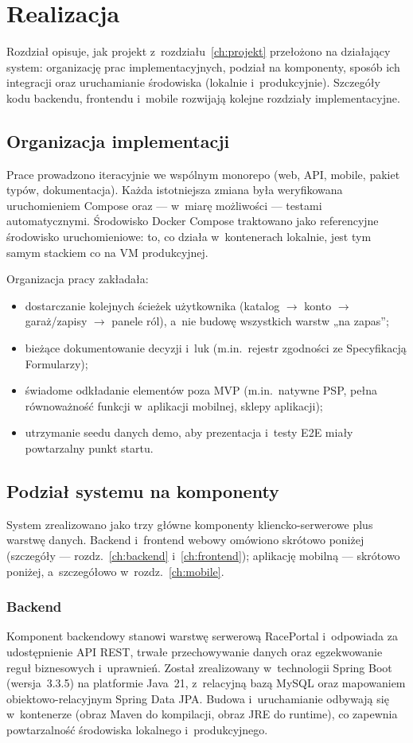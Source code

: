 \documentclass{sprz}
\begin{document}
\chapter{Realizacja}
\label{ch:realizacja}
Rozdział opisuje, jak projekt z~rozdziału~\ref{ch:projekt} przełożono na działający system: organizację prac implementacyjnych, podział na komponenty, sposób ich integracji oraz uruchamianie środowiska (lokalnie i~produkcyjnie). Szczegóły kodu backendu, frontendu i~mobile rozwijają kolejne rozdziały implementacyjne.

\section{Organizacja implementacji}
Prace prowadzono iteracyjnie we wspólnym monorepo (web, API, mobile, pakiet typów, dokumentacja). Każda istotniejsza zmiana była weryfikowana uruchomieniem Compose oraz --- w~miarę możliwości --- testami automatycznymi. Środowisko Docker Compose traktowano jako referencyjne środowisko uruchomieniowe: to, co działa w~kontenerach lokalnie, jest tym samym stackiem co na VM produkcyjnej.

Organizacja pracy zakładała:
\begin{itemize}
  \item dostarczanie kolejnych ścieżek użytkownika (katalog $\rightarrow$ konto $\rightarrow$ garaż/zapisy $\rightarrow$ panele ról), a~nie budowę wszystkich warstw „na zapas”;
  \item bieżące dokumentowanie decyzji i~luk (m.in.\ rejestr zgodności ze Specyfikacją Formularzy);
  \item świadome odkładanie elementów poza MVP (m.in.\ natywne PSP, pełna równoważność funkcji w~aplikacji mobilnej, sklepy aplikacji);
  \item utrzymanie seedu danych demo, aby prezentacja i~testy E2E miały powtarzalny punkt startu.
\end{itemize}

\section{Podział systemu na komponenty}
System zrealizowano jako trzy główne komponenty kliencko-serwerowe plus warstwę danych. Backend i~frontend webowy omówiono skrótowo poniżej (szczegóły --- rozdz.~\ref{ch:backend} i~\ref{ch:frontend}); aplikację mobilną --- skrótowo poniżej, a~szczegółowo w~rozdz.~\ref{ch:mobile}.

\subsection{Backend}
\label{sec:realizacja-backend}
Komponent backendowy stanowi warstwę serwerową RacePortal i~odpowiada za udostępnienie API REST, trwałe przechowywanie danych oraz egzekwowanie reguł biznesowych i~uprawnień. Został zrealizowany w~technologii Spring Boot (wersja~3.3.5) na platformie Java~21, z~relacyjną bazą MySQL oraz mapowaniem obiektowo-relacyjnym Spring Data JPA. Budowa i~uruchamianie odbywają się w~kontenerze (obraz Maven do kompilacji, obraz JRE do runtime), co zapewnia powtarzalność środowiska lokalnego i~produkcyjnego.
\end{document}
